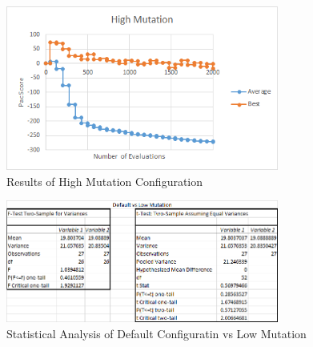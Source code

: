 \documentclass{article}
\begin{document}
\begin{flushleft}
\begin{figure}[h]
	\centering
	\includegraphics[width=0.8\textwidth]{highMut}
	\caption{Results of High Mutation Configuration}
\end{figure}

\vspace{15mm}

\begin{figure}[h]
	\centering
	\includegraphics[width=0.8\textwidth]{statDefaultVsLowMut}
	\caption{Statistical Analysis of Default Configuratin vs Low Mutation}
\end{figure}
\end{flushleft}

\clearpage
\end{document}
